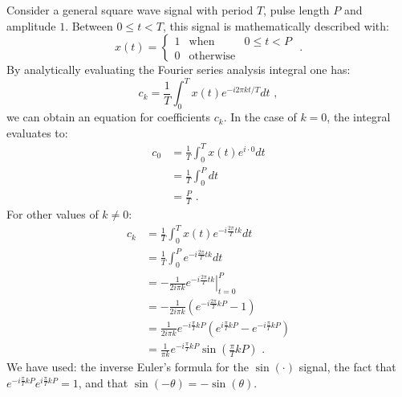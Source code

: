 Consider a general square wave signal with period $T$, pulse length $P$ and amplitude $1$. Between $0\le t < T$,
this signal is mathematically described with:
\begin{equation}
  x(t) = \left\{ \begin{array}{ccl}
    1 & \mathrm{when}      & 0 \le t < P \\
    0 & \mathrm{otherwise} &
  \end{array}
  \right. \,\,.
\end{equation}
By analytically evaluating the Fourier series analysis integral one has:
\begin{equation}
  c_k = \frac{1}{T}\int_0^T x(t) e^{-i 2\pi k t/T} dt \,\,,
\end{equation}
we can obtain an equation for coefficients $c_k$. In the case of $k=0$, the integral evaluates to:
\begin{align}
  c_0 & = \frac{1}{T}\int_0^{T} x(t) e^{i\cdot 0}dt \\
      & = \frac{1}{T}\int_0^{P}  dt                 \\
      & = \frac{P}{T} \,\,.\label{eq:pulsecoeff0}
\end{align}
For other values of $k\ne 0$:
\begin{align}
  c_k & = \frac{1}{T}\int_0^{T} x(t) e^{-i\frac{2\pi}{T} t k}dt                                                   \\
      & =  \frac{1}{T}\int_0^{P}  e^{-i\frac{2\pi}{T} t k}dt                                                      \\
      & = \left.-\frac{1 }{2i \pi k}e^{-i\frac{2\pi}{T}  t k}\right\vert_{t=0}^{P}                                \\
      & = -\frac{1}{2i\pi k}\left(e^{-i\frac{2\pi}{T}  k P} - 1\right)                                            \\
      & = \frac{1}{2i\pi k}e^{-i\frac{\pi}{T}  k P}\left(e^{i \frac{\pi}{T} kP} - e^{-i \frac{\pi}{T} kP} \right) \\
      & =  \frac{1}{\pi k}e^{-i\frac{\pi}{T}  k P}\sin\left(\frac{\pi}{T} kP\right) \,\,.\label{eq:pulsecoeff1}
\end{align}
We have used: the inverse Euler's formula for the $\sin(\cdot)$ signal, the fact
that $e^{-i\frac{\pi}{T} k P}e^{i\frac{\pi}{T} k P}=1$, and that $\sin(-\theta)=-\sin(\theta)$.

